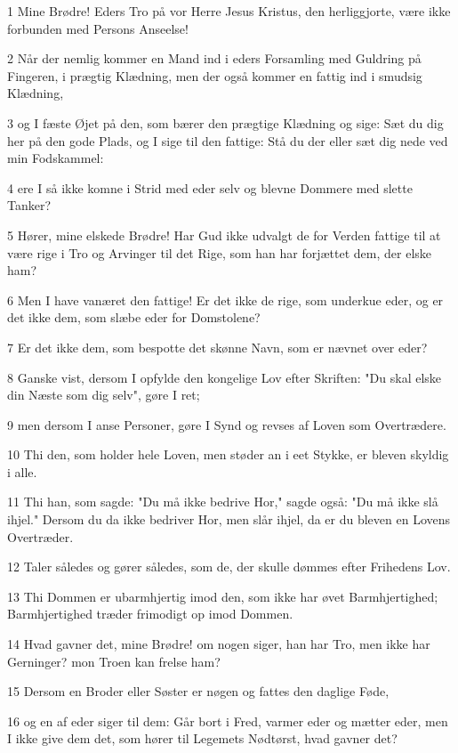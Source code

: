 \par 1 Mine Brødre! Eders Tro på vor Herre Jesus Kristus, den herliggjorte, være ikke forbunden med Persons Anseelse!
\par 2 Når der nemlig kommer en Mand ind i eders Forsamling med Guldring på Fingeren, i prægtig Klædning, men der også kommer en fattig ind i smudsig Klædning,
\par 3 og I fæste Øjet på den, som bærer den prægtige Klædning og sige: Sæt du dig her på den gode Plads, og I sige til den fattige: Stå du der eller sæt dig nede ved min Fodskammel:
\par 4 ere I så ikke komne i Strid med eder selv og blevne Dommere med slette Tanker?
\par 5 Hører, mine elskede Brødre! Har Gud ikke udvalgt de for Verden fattige til at være rige i Tro og Arvinger til det Rige, som han har forjættet dem, der elske ham?
\par 6 Men I have vanæret den fattige! Er det ikke de rige, som underkue eder, og er det ikke dem, som slæbe eder for Domstolene?
\par 7 Er det ikke dem, som bespotte det skønne Navn, som er nævnet over eder?
\par 8 Ganske vist, dersom I opfylde den kongelige Lov efter Skriften: "Du skal elske din Næste som dig selv", gøre I ret;
\par 9 men dersom I anse Personer, gøre I Synd og revses af Loven som Overtrædere.
\par 10 Thi den, som holder hele Loven, men støder an i eet Stykke, er bleven skyldig i alle.
\par 11 Thi han, som sagde: "Du må ikke bedrive Hor," sagde også: "Du må ikke slå ihjel." Dersom du da ikke bedriver Hor, men slår ihjel, da er du bleven en Lovens Overtræder.
\par 12 Taler således og gører således, som de, der skulle dømmes efter Frihedens Lov.
\par 13 Thi Dommen er ubarmhjertig imod den, som ikke har øvet Barmhjertighed; Barmhjertighed træder frimodigt op imod Dommen.
\par 14 Hvad gavner det, mine Brødre! om nogen siger, han har Tro, men ikke har Gerninger? mon Troen kan frelse ham?
\par 15 Dersom en Broder eller Søster er nøgen og fattes den daglige Føde,
\par 16 og en af eder siger til dem: Går bort i Fred, varmer eder og mætter eder, men I ikke give dem det, som hører til Legemets Nødtørst, hvad gavner det?
